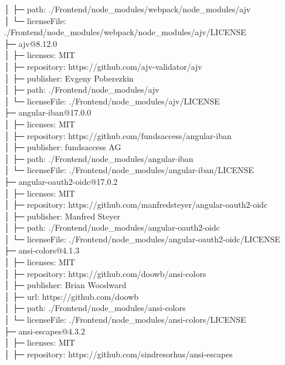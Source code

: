 \documentclass[
    paper=a4,
    twoside=false,
    parskip=half,
    listof=entryprefix,
    listof=totoc,
    index=totoc,
    bibliography=totoc,
    headsepline,
]{scrbook}
\begin{document}
    │  ├─ path: ./Frontend/node\_modules/webpack/node\_modules/ajv\\
    │  └─ licenseFile: ./Frontend/node\_modules/webpack/node\_modules/ajv/LICENSE\\
    ├─ ajv@8.12.0\\
    │  ├─ licenses: MIT\\
    │  ├─ repository: https://github.com/ajv-validator/ajv\\
    │  ├─ publisher: Evgeny Poberezkin\\
    │  ├─ path: ./Frontend/node\_modules/ajv\\
    │  └─ licenseFile: ./Frontend/node\_modules/ajv/LICENSE\\
    ├─ angular-iban@17.0.0\\
    │  ├─ licenses: MIT\\
    │  ├─ repository: https://github.com/fundsaccess/angular-iban\\
    │  ├─ publisher: fundsaccess AG\\
    │  ├─ path: ./Frontend/node\_modules/angular-iban\\
    │  └─ licenseFile: ./Frontend/node\_modules/angular-iban/LICENSE\\
    ├─ angular-oauth2-oidc@17.0.2\\
    │  ├─ licenses: MIT\\
    │  ├─ repository: https://github.com/manfredsteyer/angular-oauth2-oidc\\
    │  ├─ publisher: Manfred Steyer\\
    │  ├─ path: ./Frontend/node\_modules/angular-oauth2-oidc\\
    │  └─ licenseFile: ./Frontend/node\_modules/angular-oauth2-oidc/LICENSE\\
    ├─ ansi-colors@4.1.3\\
    │  ├─ licenses: MIT\\
    │  ├─ repository: https://github.com/doowb/ansi-colors\\
    │  ├─ publisher: Brian Woodward\\
    │  ├─ url: https://github.com/doowb\\
    │  ├─ path: ./Frontend/node\_modules/ansi-colors\\
    │  └─ licenseFile: ./Frontend/node\_modules/ansi-colors/LICENSE\\
    ├─ ansi-escapes@4.3.2\\
    │  ├─ licenses: MIT\\
    │  ├─ repository: https://github.com/sindresorhus/ansi-escapes\\
\end{document}
